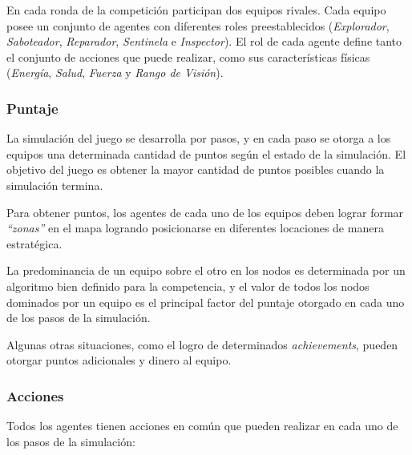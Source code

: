  En cada ronda de la competición participan dos equipos rivales.
 Cada equipo posee un conjunto de agentes con diferentes roles
 preestablecidos (\textit{Explorador}, \textit{Saboteador},
 \textit{Reparador}, \textit{Sentinela} e \textit{Inspector}).
 El rol de cada agente define tanto el conjunto de acciones que puede
 realizar, como sus características físicas (\textit{Energía},
 \textit{Salud}, \textit{Fuerza} y \textit{Rango de Visión}).

\subsubsection{Puntaje}
 \label{subsub:puntaje}

 La simulación del juego se desarrolla por pasos, y en cada paso se
 otorga a los equipos una determinada cantidad de puntos según el
 estado de la simulación.
 El objetivo del juego es obtener la mayor cantidad de puntos posibles
 cuando la simulación termina.
 
 Para obtener puntos, los agentes de cada uno de los equipos deben
 lograr formar \textit{"`zonas"'} en el mapa logrando posicionarse en
 diferentes locaciones de manera estratégica. 
 
 La predominancia de un equipo sobre el otro en los nodos es
 determinada por un algoritmo bien definido para la competencia, y el
 valor de todos los nodos dominados por un equipo es el principal
 factor del puntaje otorgado en cada uno de los pasos de la simulación.
 
 Algunas otras situaciones, como el logro de determinados
 \textit{achievements}, pueden otorgar puntos adicionales y dinero al
 equipo.

\subsubsection{Acciones}
 \label{subsub:acciones}

 Todos los agentes tienen acciones en común que pueden realizar en cada
 uno de los pasos de la simulación:
 
